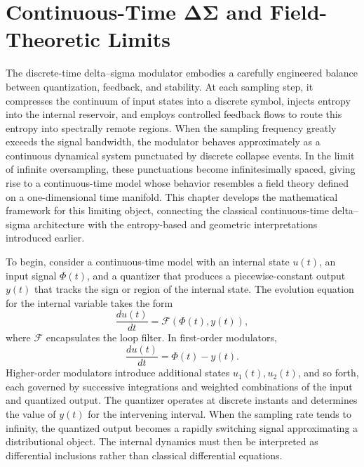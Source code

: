 
\chapter{Continuous-Time ΔΣ and Field-Theoretic Limits}

The discrete-time delta–sigma modulator embodies a carefully engineered balance between quantization, feedback, and stability. At each sampling step, it compresses the continuum of input states into a discrete symbol, injects entropy into the internal reservoir, and employs controlled feedback flows to route this entropy into spectrally remote regions. When the sampling frequency greatly exceeds the signal bandwidth, the modulator behaves approximately as a continuous dynamical system punctuated by discrete collapse events. In the limit of infinite oversampling, these punctuations become infinitesimally spaced, giving rise to a continuous-time model whose behavior resembles a field theory defined on a one-dimensional time manifold. This chapter develops the mathematical framework for this limiting object, connecting the classical continuous-time delta–sigma architecture with the entropy-based and geometric interpretations introduced earlier.

To begin, consider a continuous-time model with an internal state \(u(t)\), an input signal \(\Phi(t)\), and a quantizer that produces a piecewise-constant output \(y(t)\) that tracks the sign or region of the internal state. The evolution equation for the internal variable takes the form
\[
\frac{d u(t)}{dt} = \mathcal{F}(\Phi(t), y(t)),
\]
where \(\mathcal{F}\) encapsulates the loop filter. In first-order modulators,
\[
\frac{d u(t)}{dt} = \Phi(t) - y(t).
\]
Higher-order modulators introduce additional states \(u_1(t), u_2(t)\), and so forth, each governed by successive integrations and weighted combinations of the input and quantized output. The quantizer operates at discrete instants and determines the value of \(y(t)\) for the intervening interval. When the sampling rate tends to infinity, the quantized output becomes a rapidly switching signal approximating a distributional object. The internal dynamics must then be interpreted as differential inclusions rather than classical differential equations.

